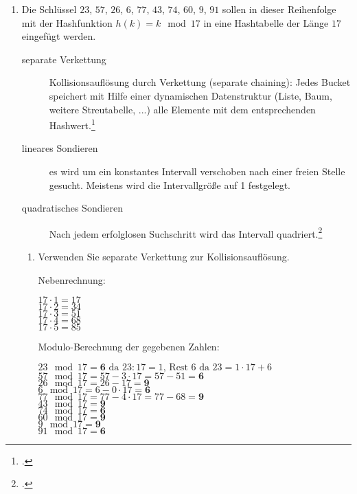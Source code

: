\documentclass{lehramt-informatik}
\begin{document}
\begin{enumerate}

\item  Die Schlüssel $23$, $57$, $26$, $6$, $77$, $43$, $74$, $60$, $9$,
$91$ sollen in dieser Reihenfolge mit der Hashfunktion $h(k) = k \mod
17$ in eine Hashtabelle der Länge $17$ eingefügt werden.

\begin{antwort}
\begin{exkurs}[Sondieren]
\begin{description}
\item[separate Verkettung]
Kollisionsauflösung durch Verkettung (separate chaining): Jedes Bucket
speichert mit Hilfe einer dynamischen Datenstruktur (Liste, Baum,
weitere Streutabelle, ...) alle Elemente mit dem entsprechenden
Hashwert.\footcite[Seite 32]{aud:fs:tafeluebung-10}

\item[lineares Sondieren]
es wird um ein konstantes Intervall verschoben nach einer freien Stelle
gesucht. Meistens wird die Intervallgröße auf 1 festgelegt.

\item[quadratisches Sondieren]
Nach jedem erfolglosen Suchschritt wird das Intervall
quadriert.\footcite{wiki:hashtabelle}
\end{description}
\end{exkurs}
\end{antwort}

\begin{enumerate}


\item Verwenden Sie separate Verkettung zur Kollisionsauflösung.

\begin{antwort}
Nebenrechnung:

$17 \cdot 1 = 17$\\
$17 \cdot 2 = 34$\\
$17 \cdot 3 = 51$\\
$17 \cdot 4 = 68$\\
$17 \cdot 5 = 85$

Modulo-Berechnung der gegebenen Zahlen:

$23 \mod 17 = \textbf{6} \text{ da } 23 : 17 = 1 \text{, Rest } 6 \text{ da } 23 = 1 \cdot 17 + 6$\\
$57 \mod 17 = 57 - 3 \cdot 17 = 57 - 51 = \textbf{6}$\\
$26 \mod 17 = 26 - 17 = \textbf{9}$\\
$6 \mod 17 = 6 - 0 \cdot 17 = \textbf{6}$\\
$77 \mod 17 = 77 - 4 \cdot 17 = 77 - 68 = \textbf{9}$\\
$43 \mod 17 = \textbf{9}$\\
$74 \mod 17 = \textbf{6}$\\
$60 \mod 17 = \textbf{9}$\\
$9 \mod 17 = \textbf{9}$\\
$91 \mod 17 = \textbf{6}$\\


\end{antwort}
\end{enumerate}
\end{enumerate}
\end{document}
